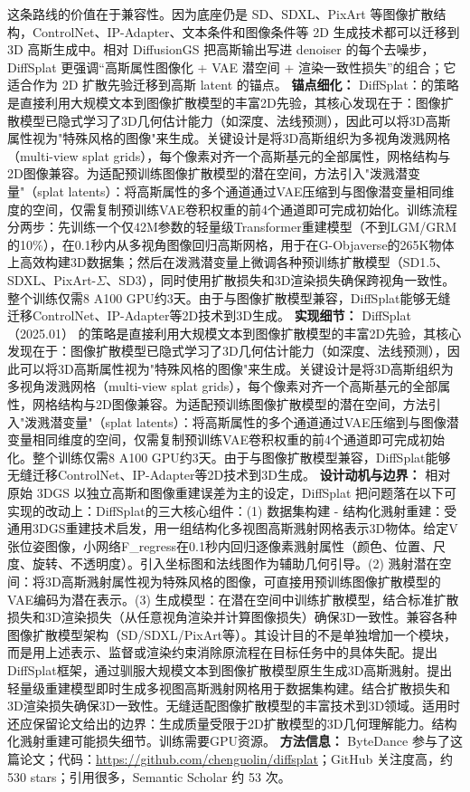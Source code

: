 这条路线的价值在于兼容性。因为底座仍是 SD、SDXL、PixArt 等图像扩散结构，ControlNet、IP-Adapter、文本条件和图像条件等 2D 生成技术都可以迁移到 3D 高斯生成中。相对 DiffusionGS 把高斯输出写进 denoiser 的每个去噪步，DiffSplat 更强调“高斯属性图像化 + VAE 潜空间 + 渲染一致性损失”的组合；它适合作为 2D 扩散先验迁移到高斯 latent 的锚点。
\textbf{锚点细化：} DiffSplat：的策略是直接利用大规模文本到图像扩散模型的丰富2D先验，其核心发现在于：图像扩散模型已隐式学习了3D几何估计能力（如深度、法线预测），因此可以将3D高斯属性视为"特殊风格的图像"来生成。关键设计是将3D高斯组织为多视角泼溅网格（multi-view splat grids），每个像素对齐一个高斯基元的全部属性，网格结构与2D图像兼容。为适配预训练图像扩散模型的潜在空间，方法引入"泼溅潜变量"（splat latents）：将高斯属性的多个通道通过VAE压缩到与图像潜变量相同维度的空间，仅需复制预训练VAE卷积权重的前4个通道即可完成初始化。训练流程分两步：先训练一个仅42M参数的轻量级Transformer重建模型（不到LGM/GRM的10\%），在0.1秒内从多视角图像回归高斯网格，用于在G-Objaverse的265K物体上高效构建3D数据集；然后在泼溅潜变量上微调各种预训练扩散模型（SD1.5、SDXL、PixArt-$\Sigma$、SD3），同时使用扩散损失和3D渲染损失确保跨视角一致性。整个训练仅需8 A100 GPU约3天。由于与图像扩散模型兼容，DiffSplat能够无缝迁移ControlNet、IP-Adapter等2D技术到3D生成。
\textbf{实现细节：} DiffSplat（2025.01） 的策略是直接利用大规模文本到图像扩散模型的丰富2D先验，其核心发现在于：图像扩散模型已隐式学习了3D几何估计能力（如深度、法线预测），因此可以将3D高斯属性视为"特殊风格的图像"来生成。关键设计是将3D高斯组织为多视角泼溅网格（multi-view splat grids），每个像素对齐一个高斯基元的全部属性，网格结构与2D图像兼容。为适配预训练图像扩散模型的潜在空间，方法引入"泼溅潜变量"（splat latents）：将高斯属性的多个通道通过VAE压缩到与图像潜变量相同维度的空间，仅需复制预训练VAE卷积权重的前4个通道即可完成初始化。整个训练仅需8 A100 GPU约3天。由于与图像扩散模型兼容，DiffSplat能够无缝迁移ControlNet、IP-Adapter等2D技术到3D生成。
\textbf{设计动机与边界：} 相对原始 3DGS 以独立高斯和图像重建误差为主的设定，DiffSplat 把问题落在以下可实现的改动上：DiffSplat的三大核心组件：(1) 数据集构建 - 结构化溅射重建：受通用3DGS重建技术启发，用一组结构化多视图高斯溅射网格表示3D物体。给定V张位姿图像，小网络F\_regress在0.1秒内回归逐像素溅射属性（颜色、位置、尺度、旋转、不透明度）。引入坐标图和法线图作为辅助几何引导。(2) 溅射潜在空间：将3D高斯溅射属性视为特殊风格的图像，可直接用预训练图像扩散模型的VAE编码为潜在表示。(3) 生成模型：在潜在空间中训练扩散模型，结合标准扩散损失和3D渲染损失（从任意视角渲染并计算图像损失）确保3D一致性。兼容各种图像扩散模型架构（SD/SDXL/PixArt等）。其设计目的不是单独增加一个模块，而是用上述表示、监督或渲染约束消除原流程在目标任务中的具体失配。提出DiffSplat框架，通过驯服大规模文本到图像扩散模型原生生成3D高斯溅射。提出轻量级重建模型即时生成多视图高斯溅射网格用于数据集构建。结合扩散损失和3D渲染损失确保3D一致性。无缝适配图像扩散模型的丰富技术到3D领域。适用时还应保留论文给出的边界：生成质量受限于2D扩散模型的3D几何理解能力。结构化溅射重建可能损失细节。训练需要GPU资源。
\textbf{方法信息：} ByteDance 参与了这篇论文；代码：\url{https://github.com/chenguolin/diffsplat}；GitHub 关注度高，约 530 stars；引用很多，Semantic Scholar 约 53 次。



